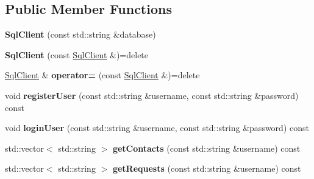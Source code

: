 \subsection*{Public Member Functions}
\begin{DoxyCompactItemize}
\item 
\mbox{\label{classbbl_1_1srv_1_1_sql_client_a5e36d3c286d32aa8ddf172e1563ead62}} 
{\bfseries Sql\+Client} (const std\+::string \&database)
\item 
\mbox{\label{classbbl_1_1srv_1_1_sql_client_a9644bdc97fde0a7aeb075f67d789a6f9}} 
{\bfseries Sql\+Client} (const \hyperlink{classbbl_1_1srv_1_1_sql_client}{Sql\+Client} \&)=delete
\item 
\mbox{\label{classbbl_1_1srv_1_1_sql_client_a09faaad41f17bd1021c457379307bcd3}} 
\hyperlink{classbbl_1_1srv_1_1_sql_client}{Sql\+Client} \& {\bfseries operator=} (const \hyperlink{classbbl_1_1srv_1_1_sql_client}{Sql\+Client} \&)=delete
\item 
\mbox{\label{classbbl_1_1srv_1_1_sql_client_ad335279e409901ac94d2dfaf3855a04d}} 
void {\bfseries register\+User} (const std\+::string \&username, const std\+::string \&password) const
\item 
\mbox{\label{classbbl_1_1srv_1_1_sql_client_a7f0661b2848724af3b2dc79aca3a8d9f}} 
void {\bfseries login\+User} (const std\+::string \&username, const std\+::string \&password) const
\item 
\mbox{\label{classbbl_1_1srv_1_1_sql_client_ade6054df37f4bc4753f029c999e44778}} 
std\+::vector$<$ std\+::string $>$ {\bfseries get\+Contacts} (const std\+::string \&username) const
\item 
\mbox{\label{classbbl_1_1srv_1_1_sql_client_af9522692004b248db03e2b27b2549889}} 
std\+::vector$<$ std\+::string $>$ {\bfseries get\+Requests} (const std\+::string \&username) const
\item 
\mbox{\label{classbbl_1_1srv_1_1_sql_client_ae9e4dde1aeec2412b7ee1c692f5cb11d}} 

\end{DoxyCompactItemize}
